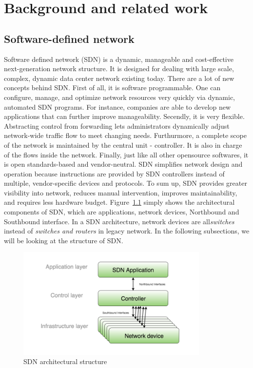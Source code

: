 \chapter{Background and related work}

\section{Software-defined network}
\label{Software-defined network}
Software defined network (SDN) is a dynamic, manageable and cost-effective next-generation network structure. It is designed for dealing with large scale, complex, dynamic data center network existing today. There are a lot of new concepts behind SDN. First of all, it is software programmable. One can configure, manage, and optimize network resources very quickly via dynamic, automated SDN programs. For instance, companies are able to develop new applications that can further improve manageability. Secendly, it is very flexible. Abstracting control from forwarding lets administrators dynamically adjust network-wide traffic flow to meet changing needs. Furthurmore, a complete scope of the network is maintained by the central unit - controller. It is also in charge of the flows inside the network. Finally, just like all other opensource softwares, it is open standards-based and vendor-neutral. SDN simplifies network design and operation because instructions are provided by SDN controllers instead of multiple, vendor-specific devices and protocols. To sum up, SDN provides greater visibility into network, reduces manual intervention, improves maintainability, and requires less hardware budget. Figure~\ref{SDN_struct} simply shows the architectural components of SDN, which are applications, network devices, Northbound and Southbound interface. In a SDN architecture, network devices are all\textit{switches} instead of \textit{switches and routers} in legacy network. In the following subsections, we will be looking at the structure of SDN.

\begin{figure}[H]
\begin{center} 
\includegraphics[width=0.85\textwidth]{figures/SDN_structure.png}
\end{center}
\caption{SDN architectural structure}
\label{SDN_struct}
\end{figure}

